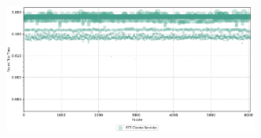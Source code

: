 \begin{apendicesenv}
\begin{figure}[htbp!]
\begin{subfigure}[t]{0.5\textwidth}
        \includegraphics[width=1\textwidth, height=120pt]{USPSC-img/output/cropped/0-mitm_arp-rttp.png}
    \end{subfigure}%
\end{figure}


\end{apendicesenv}
